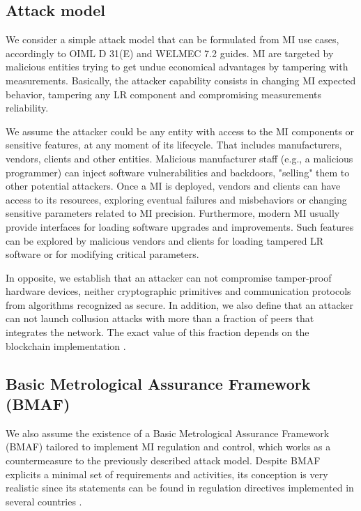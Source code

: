 \documentclass[journal]{IEEEtran} %
\begin{document}
\subsection{Attack model}
We consider a simple attack model that can be formulated from MI use cases, accordingly to OIML D 31(E) and WELMEC 7.2 guides. MI are targeted by malicious entities trying to get undue economical advantages by tampering with measurements. Basically, the attacker capability consists in changing MI expected behavior, tampering any LR component and compromising measurements reliability. 

We assume the attacker could be any entity with access to the MI components or sensitive features, at any moment of its lifecycle. 
That includes manufacturers, vendors, clients and other entities. Malicious manufacturer staff (e.g., a malicious programmer) can inject software vulnerabilities and backdoors, "selling" them to other potential attackers. 
Once a MI is deployed, vendors and clients can have access to its resources, exploring eventual failures and misbehaviors or changing sensitive parameters related to MI precision. 
Furthermore, modern MI usually provide interfaces for loading software upgrades and improvements.
Such features can be explored by malicious vendors and clients for loading tampered LR software or for modifying critical parameters.

In opposite, we establish that an attacker can not compromise tamper-proof hardware devices, neither cryptographic primitives and communication protocols from algorithms recognized as secure. In addition, we also define that an attacker can not launch collusion attacks with more than a fraction of peers that integrates the network. The exact value of this fraction depends on the blockchain implementation \cite{Vukolic2016}. %

\subsection{Basic Metrological Assurance Framework (BMAF)}
We also assume the existence of a Basic Metrological Assurance Framework (BMAF) tailored to implement MI regulation and control, which works as a countermeasure to the  previously described attack model. Despite BMAF explicits a minimal set of requirements and activities, its conception is very realistic since its statements can be found in regulation directives implemented in several countries \cite{Esche2015,Camara2012,Boccardo2014,Luchsinger2008}.
\end{document}
